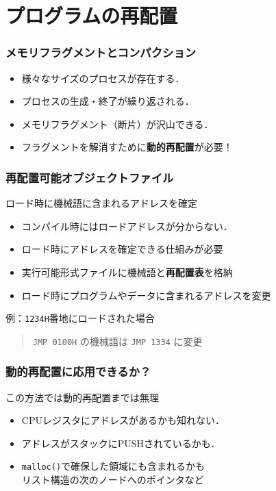 \documentclass[unicode,handout]{beamer}                   %
\begin{document}
\section{プログラムの再配置}
\begin{frame}
  \frametitle{メモリフラグメントとコンパクション}
  \begin{itemize}
    \item 様々なサイズのプロセスが存在する．
    \item プロセスの生成・終了が繰り返される．
    \item メモリフラグメント（断片）が沢山できる．
    \item フラグメントを解消すために{\bf 動的再配置}が必要！
  \end{itemize}
\end{frame}

\begin{frame}
  \frametitle{再配置可能オブジェクトファイル}
  ロード時に機械語に含まれるアドレスを確定
  \begin{itemize}
    \item コンパイル時にはロードアドレスが分からない．
    \item ロード時にアドレスを確定できる仕組みが必要
    \item 実行可能形式ファイルに機械語と{\bf 再配置表}を格納
    \item ロード時にプログラムやデータに含まれるアドレスを変更
  \end{itemize}
  \vfill
    例：{\tt 1234H}番地にロードされた場合\\
    \begin{quote}
    {\tt JMP 0100H} の機械語は {\tt JMP 1334} に変更
    \end{quote}
\end{frame}

\begin{frame}
  \frametitle{動的再配置に応用できるか？}
    この方法では動的再配置までは無理
  \begin{itemize}
    \item CPUレジスタにアドレスがあるかも知れない．
    \item アドレスがスタックにPUSHされているかも．
    \item {\tt malloc()}で確保した領域にも含まれるかも\\
      リスト構造の次のノードへのポインタなど
  \end{itemize}
\end{frame}
\end{document}

